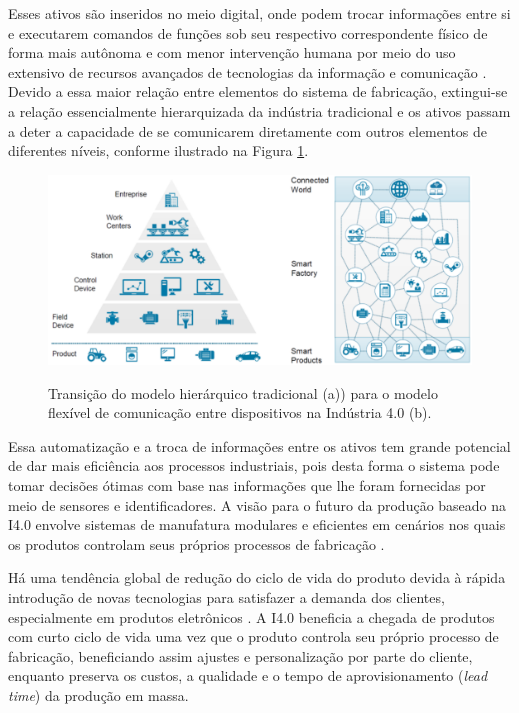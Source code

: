 \documentclass[
	12pt,				%
	oneside,			%
	a4paper,			%
	english,			%
	brazil				%
]{abntex2}
\begin{document}
	Esses ativos são inseridos no meio digital, onde podem trocar informações entre si e executarem comandos de funções sob seu respectivo correspondente físico de forma mais autônoma e com menor intervenção humana por meio do uso extensivo de recursos avançados de tecnologias da informação e comunicação \cite{adolph2018roadmap}. Devido a essa maior relação entre elementos do sistema de fabricação, extingui-se a relação essencialmente hierarquizada da indústria tradicional e os ativos passam a deter a capacidade de se comunicarem diretamente com outros elementos de diferentes níveis, conforme ilustrado na Figura \ref{fig:i3-to-i4}.
	
	\begin{figure}[H]
		\centering
		\caption{Transição do modelo hierárquico tradicional (a)) para o modelo flexível de comunicação entre dispositivos na Indústria 4.0 (b).}
		\includegraphics[width=1\textwidth]{i3-to-i4.png}
		\label{fig:i3-to-i4}
	\end{figure}

	Essa automatização e a troca de informações entre os ativos tem grande potencial de dar mais eficiência aos processos industriais, pois desta forma o sistema pode tomar decisões ótimas com base nas informações que lhe foram fornecidas por meio de sensores e identificadores. A visão para o futuro da produção baseado na I4.0 envolve sistemas de manufatura modulares e eficientes em cenários nos quais os produtos controlam seus próprios processos de fabricação \cite{lasi2014industryfour}.
	
	Há uma tendência global de redução do ciclo de vida do produto devida à rápida introdução de novas tecnologias para satisfazer a demanda dos clientes, especialmente em produtos eletrônicos \cite{trappey2008lifecycle}. A I4.0 beneficia a chegada de produtos com curto ciclo de vida uma vez que o produto controla seu próprio processo de fabricação, beneficiando assim ajustes e personalização por parte do cliente, enquanto preserva os custos, a qualidade e o tempo de aprovisionamento (\textit{lead time}) da produção em massa.
	
\end{document}
